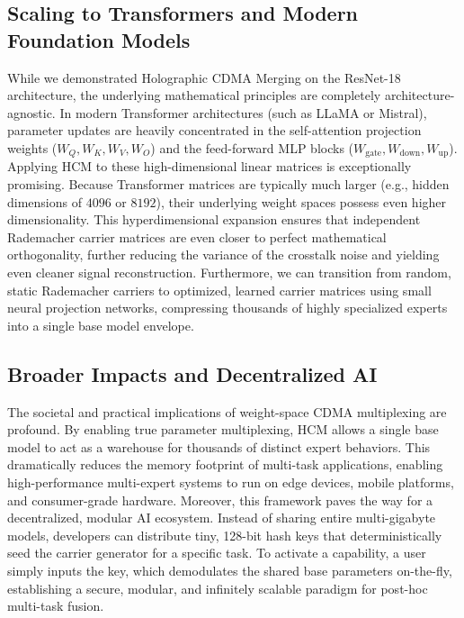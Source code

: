 \documentclass{article}
\begin{document}
\subsection{Scaling to Transformers and Modern Foundation Models}
While we demonstrated Holographic CDMA Merging on the ResNet-18 architecture, the underlying mathematical principles are completely architecture-agnostic. In modern Transformer architectures (such as LLaMA or Mistral), parameter updates are heavily concentrated in the self-attention projection weights ($W_Q, W_K, W_V, W_O$) and the feed-forward MLP blocks ($W_{\text{gate}}, W_{\text{down}}, W_{\text{up}}$). Applying HCM to these high-dimensional linear matrices is exceptionally promising. Because Transformer matrices are typically much larger (e.g., hidden dimensions of $4096$ or $8192$), their underlying weight spaces possess even higher dimensionality. This hyperdimensional expansion ensures that independent Rademacher carrier matrices are even closer to perfect mathematical orthogonality, further reducing the variance of the crosstalk noise and yielding even cleaner signal reconstruction. Furthermore, we can transition from random, static Rademacher carriers to optimized, learned carrier matrices using small neural projection networks, compressing thousands of highly specialized experts into a single base model envelope.

\subsection{Broader Impacts and Decentralized AI}
The societal and practical implications of weight-space CDMA multiplexing are profound. By enabling true parameter multiplexing, HCM allows a single base model to act as a warehouse for thousands of distinct expert behaviors. This dramatically reduces the memory footprint of multi-task applications, enabling high-performance multi-expert systems to run on edge devices, mobile platforms, and consumer-grade hardware. Moreover, this framework paves the way for a decentralized, modular AI ecosystem. Instead of sharing entire multi-gigabyte models, developers can distribute tiny, 128-bit hash keys that deterministically seed the carrier generator for a specific task. To activate a capability, a user simply inputs the key, which demodulates the shared base parameters on-the-fly, establishing a secure, modular, and infinitely scalable paradigm for post-hoc multi-task fusion.
\end{document}
